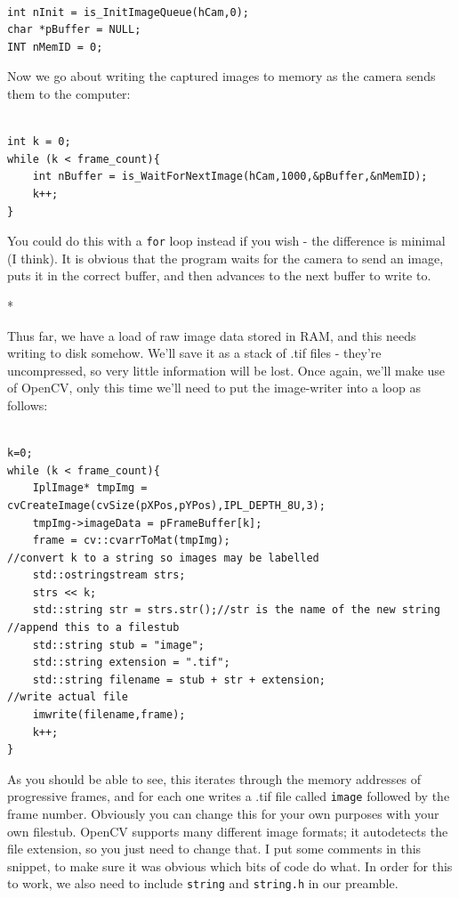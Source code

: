 \documentclass[12pt,a4paper]{article}
\begin{document}
\lstset{language=C++}
\begin{lstlisting}

int nInit = is_InitImageQueue(hCam,0);
char *pBuffer = NULL;
INT nMemID = 0;

\end{lstlisting}

Now we go about writing the captured images to memory as the camera sends them to the computer:

\lstset{language=C++}
\begin{lstlisting}

int k = 0;
while (k < frame_count){
	int nBuffer = is_WaitForNextImage(hCam,1000,&pBuffer,&nMemID);
	k++;
}

\end{lstlisting}

You could do this with a \texttt{for} loop instead if you wish - the difference is minimal (I think). It is obvious that the program waits for the camera to send an image, puts it in the correct buffer, and then advances to the next buffer to write to.

*

Thus far, we have a load of raw image data stored in RAM, and this needs writing to disk somehow. We'll save it as a stack of .tif files - they're uncompressed, so very little information will be lost. Once again, we'll make use of OpenCV, only this time we'll need to put the image-writer into a loop as follows:

\lstset{language=C++}
\begin{lstlisting}

k=0;
while (k < frame_count){
	IplImage* tmpImg = cvCreateImage(cvSize(pXPos,pYPos),IPL_DEPTH_8U,3);
	tmpImg->imageData = pFrameBuffer[k];
	frame = cv::cvarrToMat(tmpImg);
//convert k to a string so images may be labelled
	std::ostringstream strs;
	strs << k;
	std::string str = strs.str();//str is the name of the new string
//append this to a filestub
	std::string stub = "image";
	std::string extension = ".tif";
	std::string filename = stub + str + extension;
//write actual file
	imwrite(filename,frame);
	k++;
}

\end{lstlisting}

As you should be able to see, this iterates through the memory addresses of progressive frames, and for each one writes a .tif file called \texttt{image} followed by the frame number. Obviously you can change this for your own purposes with your own filestub. OpenCV supports many different image formats; it autodetects the file extension, so you just need to change that. I put some comments in this snippet, to make sure it was obvious which bits of code do what. In order for this to work, we also need to include \texttt{string} and \texttt{string.h} in our preamble.
\end{document}
